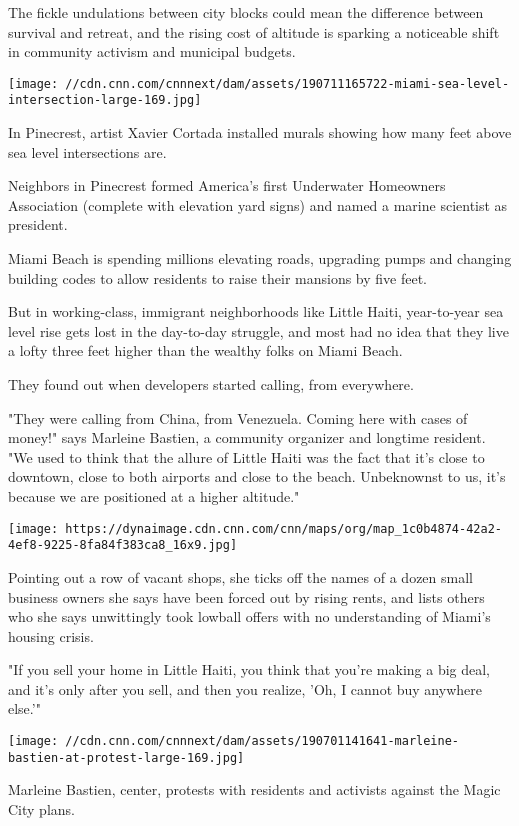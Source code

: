 The fickle undulations between city blocks could mean the difference
between survival and retreat, and the rising cost of altitude is
sparking a noticeable shift in community activism and municipal budgets.

\texttt{[image: //cdn.cnn.com/cnnnext/dam/assets/190711165722-miami-sea-level-intersection-large-169.jpg]}

In Pinecrest, artist Xavier Cortada installed murals showing how many
feet above sea level intersections are.

Neighbors in Pinecrest formed America's first Underwater Homeowners
Association (complete with elevation yard signs) and named a marine
scientist as president.

Miami Beach is spending millions elevating roads, upgrading pumps and
changing building codes to allow residents to raise their mansions by
five feet.

But in working-class, immigrant neighborhoods like Little Haiti,
year-to-year sea level rise gets lost in the day-to-day struggle, and
most had no idea that they live a lofty three feet higher than the
wealthy folks on Miami Beach.

They found out when developers started calling, from everywhere.

"They were calling from China, from Venezuela. Coming here with cases of
money!" says Marleine Bastien, a community organizer and longtime
resident. "We used to think that the allure of Little Haiti was the fact
that it's close to downtown, close to both airports and close to the
beach. Unbeknownst to us, it's because we are positioned at a higher
altitude."

\texttt{[image: https://dynaimage.cdn.cnn.com/cnn/maps/org/map\_1c0b4874-42a2-4ef8-9225-8fa84f383ca8\_16x9.jpg]}

Pointing out a row of vacant shops, she ticks off the names of a dozen
small business owners she says have been forced out by rising rents, and
lists others who she says unwittingly took lowball offers with no
understanding of Miami's housing crisis.

"If you sell your home in Little Haiti, you think that you're making a
big deal, and it's only after you sell, and then you realize, 'Oh, I
cannot buy anywhere else.'"

\texttt{[image: //cdn.cnn.com/cnnnext/dam/assets/190701141641-marleine-bastien-at-protest-large-169.jpg]}

Marleine Bastien, center, protests with residents and activists against
the Magic City plans.

